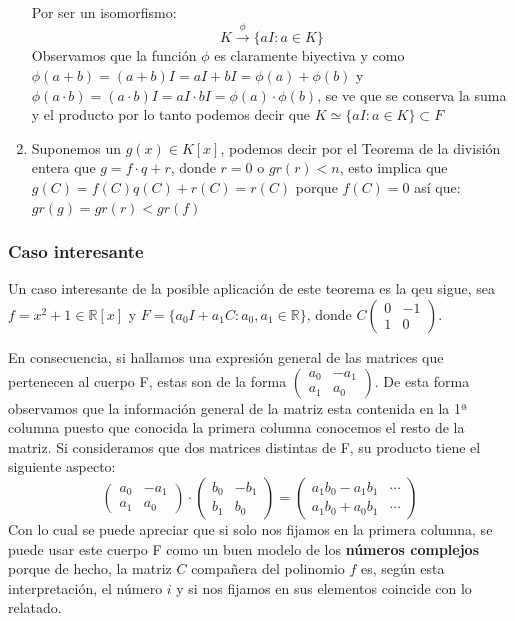 \documentclass[10pt,a4paper,openright]{book}
\begin{document}
\begin{enumerate}
Por ser un isomorfismo:
$$K\stackrel{\phi}{\rightarrow}\{aI: a\in K\}$$
Observamos que la función $\phi$ es claramente biyectiva y como $\phi(a+b)=(a+b)I=aI+bI=\phi(a)+\phi(b)$ y $\phi(a\cdot b)=(a\cdot b)I=aI\cdot bI=\phi(a)\cdot \phi(b)$, se ve que se conserva la suma y el producto por lo tanto podemos decir que $K\simeq \{aI: a\in K\}\subset F$
\vspace{0.5cm}
\item Suponemos un $g(x)\in K[x]$, podemos decir por el Teorema de la división entera que $g=f\cdot q + r$, donde $r=0$ o $gr(r)<n$, esto implica que $g(C)=f(C)q(C)+r(C)=r(C)$ porque $f(C)=0$ así que: $gr(g)=gr(r)<gr(f)$
\end{enumerate}

\subsubsection*{Caso interesante}
Un caso interesante de la posible aplicación de este teorema es la qeu sigue, sea $f=x^2+1\in \mathbb R[x]$ y $F=\{a_0I+a_1C: a_0,a_1\in \mathbb R\}$, donde $C\left(\begin{array}{cc} 0 & -1 \\ 1 & 0 \end{array}\right)$.\par
En consecuencia, si hallamos una expresión general de las matrices que pertenecen al cuerpo F, estas son de la forma $\left(\begin{array}{cc}a_0 & -a_1 \\ a_1 & a_0\end{array}\right)$. De esta forma observamos que la información general de la matriz esta contenida en la 1ª columna puesto que conocida la primera columna conocemos el resto de la matriz. Si consideramos que dos matrices distintas de F, su producto tiene el siguiente aspecto:
$$\left(\begin{array}{cc}a_0 & -a_1 \\ a_1 & a_0\end{array}\right)\cdot \left(\begin{array}{cc}b_0 & -b_1 \\ b_1 & b_0\end{array}\right)=\left(\begin{array}{cc}a_1b_0-a_1b_1 & \cdots \\ a_1b_0+a_0b_1 & \cdots \end{array}\right)$$
Con lo cual se puede apreciar que si solo nos fijamos en la primera columna, se puede usar este cuerpo F como un buen modelo de los \textbf{números complejos} porque de hecho, la matriz $C$ compañera del polinomio $f$ es, según esta interpretación, el número $i$ y si nos fijamos en sus elementos coincide con lo relatado.
\end{document}
